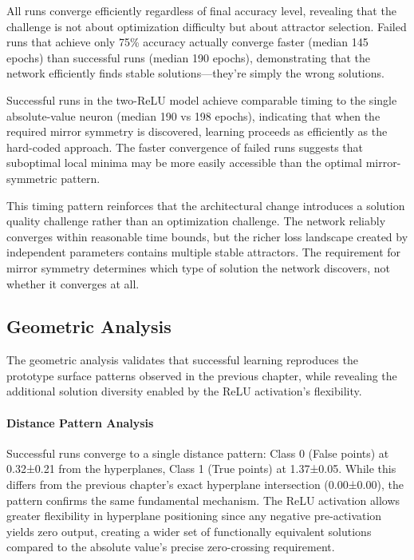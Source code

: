 All runs converge efficiently regardless of final accuracy level, revealing that the challenge is not about optimization difficulty but about attractor selection. Failed runs that achieve only 75\% accuracy actually converge faster (median 145 epochs) than successful runs (median 190 epochs), demonstrating that the network efficiently finds stable solutions—they're simply the wrong solutions.

Successful runs in the two-ReLU model achieve comparable timing to the single absolute-value neuron (median 190 vs 198 epochs), indicating that when the required mirror symmetry is discovered, learning proceeds as efficiently as the hard-coded approach. The faster convergence of failed runs suggests that suboptimal local minima may be more easily accessible than the optimal mirror-symmetric pattern.

This timing pattern reinforces that the architectural change introduces a solution quality challenge rather than an optimization challenge. The network reliably converges within reasonable time bounds, but the richer loss landscape created by independent parameters contains multiple stable attractors. The requirement for mirror symmetry determines which type of solution the network discovers, not whether it converges at all.


\subsection*{Geometric Analysis}

The geometric analysis validates that successful learning reproduces the prototype surface patterns observed in the previous chapter, while revealing the additional solution diversity enabled by the ReLU activation's flexibility.

\paragraph{Distance Pattern Analysis}
Successful runs converge to a single distance pattern: Class 0 (False points) at 0.32±0.21 from the hyperplanes, Class 1 (True points) at 1.37±0.05. While this differs from the previous chapter's exact hyperplane intersection (0.00±0.00), the pattern confirms the same fundamental mechanism. The ReLU activation allows greater flexibility in hyperplane positioning since any negative pre-activation yields zero output, creating a wider set of functionally equivalent solutions compared to the absolute value's precise zero-crossing requirement.

